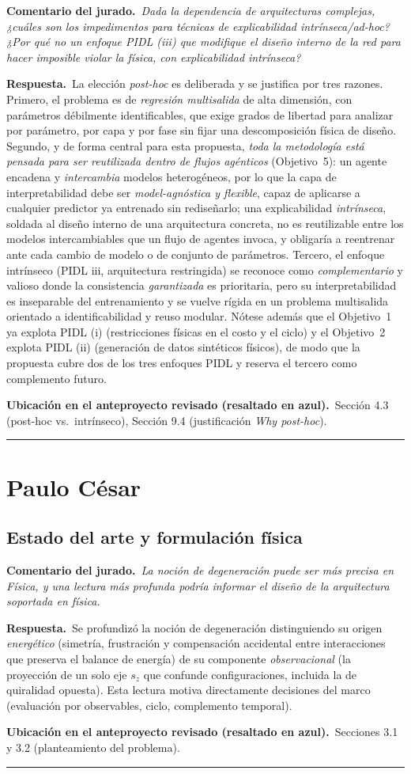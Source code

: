 \documentclass[11pt]{article}
\newcommand{\comentario}[1]{\par\smallskip\noindent\textbf{\color{jgris}Comentario del jurado.}\ \textit{#1}\par}
\newcommand{\respuesta}[1]{\par\smallskip\noindent\textbf{\color{jverde}Respuesta.}\ #1\par}
\newcommand{\ubic}[1]{\par\smallskip\noindent\textbf{\color{jazul}Ubicación en el anteproyecto revisado (resaltado en azul).}\ #1\par\medskip\hrule\medskip}
\begin{document}
\comentario{Dada la dependencia de arquitecturas complejas, ¿cuáles son los impedimentos para técnicas de explicabilidad intrínseca/ad-hoc? ¿Por qué no un enfoque PIDL (iii) que modifique el diseño interno de la red para hacer imposible violar la física, con explicabilidad intrínseca?}
\respuesta{La elección \emph{post-hoc} es deliberada y se justifica por tres razones. Primero, el problema es de \emph{regresión multisalida} de alta dimensión, con parámetros débilmente identificables, que exige grados de libertad para analizar por parámetro, por capa y por fase sin fijar una descomposición física de diseño. Segundo, y de forma central para esta propuesta, \emph{toda la metodología está pensada para ser reutilizada dentro de flujos agénticos} (Objetivo~5): un agente encadena y \emph{intercambia} modelos heterogéneos, por lo que la capa de interpretabilidad debe ser \emph{model-agnóstica y flexible}, capaz de aplicarse a cualquier predictor ya entrenado sin rediseñarlo; una explicabilidad \emph{intrínseca}, soldada al diseño interno de una arquitectura concreta, no es reutilizable entre los modelos intercambiables que un flujo de agentes invoca, y obligaría a reentrenar ante cada cambio de modelo o de conjunto de parámetros. Tercero, el enfoque intrínseco (PIDL iii, arquitectura restringida) se reconoce como \emph{complementario} y valioso donde la consistencia \emph{garantizada} es prioritaria, pero su interpretabilidad es inseparable del entrenamiento y se vuelve rígida en un problema multisalida orientado a identificabilidad y reuso modular. Nótese además que el Objetivo~1 ya explota PIDL (i) (restricciones físicas en el costo y el ciclo) y el Objetivo~2 explota PIDL (ii) (generación de datos sintéticos físicos), de modo que la propuesta cubre dos de los tres enfoques PIDL y reserva el tercero como complemento futuro.}
\ubic{Sección 4.3 (post-hoc vs.\ intrínseco), Sección 9.4 (justificación \emph{Why post-hoc}).}

\section{Paulo César}

\subsection{Estado del arte y formulación física}

\comentario{La noción de degeneración puede ser más precisa en Física, y una lectura más profunda podría informar el diseño de la arquitectura soportada en física.}
\respuesta{Se profundizó la noción de degeneración distinguiendo su origen \emph{energético} (simetría, frustración y compensación accidental entre interacciones que preserva el balance de energía) de su componente \emph{observacional} (la proyección de un solo eje $s_z$ que confunde configuraciones, incluida la de quiralidad opuesta). Esta lectura motiva directamente decisiones del marco (evaluación por observables, ciclo, complemento temporal).}
\ubic{Secciones 3.1 y 3.2 (planteamiento del problema).}
\end{document}
